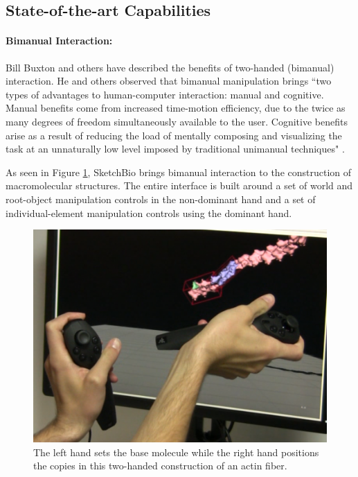 \documentclass[twocolumn]{bmcart}%
\begin{document}
\subsection*{State-of-the-art Capabilities}

\paragraph*{Bimanual Interaction:}
Bill Buxton and others have described the benefits of two-handed (bimanual) interaction.
He and others observed that bimanual manipulation brings ``two types of advantages to human-computer interaction: manual and cognitive. Manual benefits come from increased time-motion efficiency, due to the twice as many degrees of freedom simultaneously available to the user.
Cognitive benefits arise as a result of reducing the load of mentally composing and visualizing the task at an unnaturally low level imposed by traditional unimanual techniques" \cite{Leganchuk1998manual}.

As seen in Figure \ref{fig:two_hands}, SketchBio brings bimanual interaction to the construction of macromolecular structures.
The entire interface is built around a set of world and root-object manipulation controls in the non-dominant hand and a set of individual-element manipulation controls using the dominant hand.

\begin{figure}[ht]
\centering
\includegraphics[width=0.9\columnwidth]{two_hands.png}
\caption{The left hand sets the base molecule while the right hand positions the copies in this two-handed construction of an actin fiber.}
\label{fig:two_hands}
\end{figure}
\end{document}

